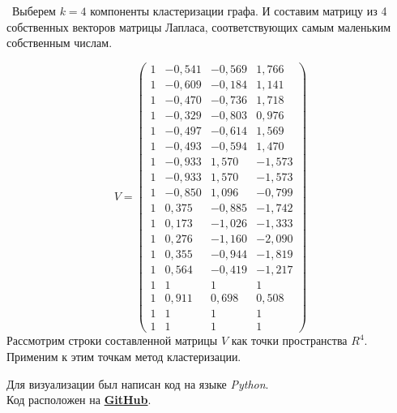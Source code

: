 \documentclass[a5paper, 10pt]{article}
\theoremstyle{definition}
\theoremstyle{plain}
\theoremstyle{remark}
\begin{document}
\newpage
\,
\newpage
Выберем $k=4$ компоненты кластеризации графа. И составим матрицу из 4 собственных векторов матрицы Лапласа, соответствующих самым маленьким собственным числам. 

\begin{equation}
V =
\left(\begin{matrix}
1 & -0,541  & -0,569 & 1,766\\
1 & -0,609 & -0,184 & 1,141\\
1 & -0,470 & -0,736 & 1,718\\
1 & -0,329 & -0,803 & 0,976\\
1 & -0,497 & -0,614 & 1,569\\
1 & -0,493 & -0,594 & 1,470\\
1 & -0,933 & 1,570 & -1,573\\
1 & -0,933 & 1,570 & -1,573\\
1 & -0,850 & 1,096 & -0,799\\
1 & 0,375 & -0,885 & -1,742\\
1 & 0,173 & -1,026 & -1,333\\
1 & 0,276 & -1,160 & -2,090\\
1 & 0,355 & -0,944 & -1,819\\
1 & 0,564 & -0,419 & -1,217\\
1 & 1 & 1 & 1\\
1 & 0,911 & 0,698 & 0,508\\
1 & 1 & 1 & 1\\
1 & 1 & 1 & 1
\end{matrix}\right)
\end{equation}
Рассмотрим строки составленной матрицы $V$ как точки пространства  $R^4$. Применим к этим точкам метод кластеризации.


\newpage
Для визуализации был написан код на языке \textit{Python}. \\
Код расположен на \href{https://github.com/a-nechaeva/practical_Linal/tree/main/lab4}{\textbf{GitHub}}.
\end{document}

